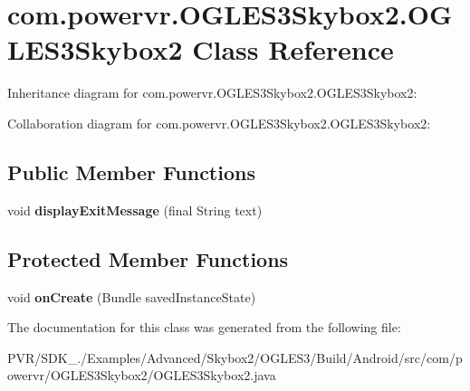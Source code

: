 \hypertarget{classcom_1_1powervr_1_1_o_g_l_e_s3_skybox2_1_1_o_g_l_e_s3_skybox2}{\section{com.\+powervr.\+O\+G\+L\+E\+S3\+Skybox2.\+O\+G\+L\+E\+S3\+Skybox2 Class Reference}
\label{classcom_1_1powervr_1_1_o_g_l_e_s3_skybox2_1_1_o_g_l_e_s3_skybox2}
}


Inheritance diagram for com.\+powervr.\+O\+G\+L\+E\+S3\+Skybox2.\+O\+G\+L\+E\+S3\+Skybox2\+:


Collaboration diagram for com.\+powervr.\+O\+G\+L\+E\+S3\+Skybox2.\+O\+G\+L\+E\+S3\+Skybox2\+:
\subsection*{Public Member Functions}
\begin{DoxyCompactItemize}
\item 
\hypertarget{classcom_1_1powervr_1_1_o_g_l_e_s3_skybox2_1_1_o_g_l_e_s3_skybox2_af761b803f28355ae12be72cc66048df9}{void {\bfseries display\+Exit\+Message} (final String text)}\label{classcom_1_1powervr_1_1_o_g_l_e_s3_skybox2_1_1_o_g_l_e_s3_skybox2_af761b803f28355ae12be72cc66048df9}

\end{DoxyCompactItemize}
\subsection*{Protected Member Functions}
\begin{DoxyCompactItemize}
\item 
\hypertarget{classcom_1_1powervr_1_1_o_g_l_e_s3_skybox2_1_1_o_g_l_e_s3_skybox2_a4be41ad748587bad2cf2d60ccf22df1f}{void {\bfseries on\+Create} (Bundle saved\+Instance\+State)}\label{classcom_1_1powervr_1_1_o_g_l_e_s3_skybox2_1_1_o_g_l_e_s3_skybox2_a4be41ad748587bad2cf2d60ccf22df1f}

\end{DoxyCompactItemize}


The documentation for this class was generated from the following file\+:\begin{DoxyCompactItemize}
\item 
P\+V\+R/\+S\+D\+K\+\_./\+Examples/\+Advanced/\+Skybox2/\+O\+G\+L\+E\+S3/\+Build/\+Android/src/com/powervr/\+O\+G\+L\+E\+S3\+Skybox2/O\+G\+L\+E\+S3\+Skybox2.\+java\end{DoxyCompactItemize}
